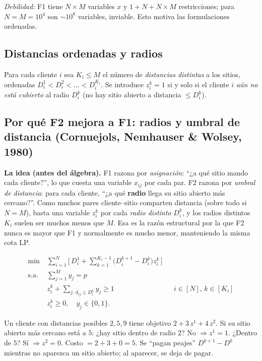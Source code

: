 \emph{Debilidad:} F1 tiene $N\times M$ variables $x$ y $1+N+N\times M$ restricciones; para
$N=M=10^4$ son $\sim 10^8$ variables, inviable. Esto motiva las formulaciones ordenadas.

\subsection{Distancias ordenadas y radios}
Para cada cliente $i$ sea $K_i\le M$ el número de \emph{distancias distintas} a los sitios,
ordenadas $D^1_i<D^2_i<\dots<D^{K_i}_i$. Se introduce $z^k_i=1$ si y solo si el cliente $i$
\emph{aún no está cubierto} al radio $D^k_i$ (no hay sitio abierto a distancia $\le D^k_i$).

\subsection{Por qué F2 mejora a F1: radios y umbral de distancia (Cornuejols, Nemhauser \& Wolsey, 1980)}
\textbf{La idea (antes del álgebra).} F1 razona por \emph{asignación}: ``¿a qué sitio mando cada
cliente?'', lo que cuesta una variable $x_{ij}$ por cada par. F2 razona por \emph{umbral de
distancia}: para cada cliente, ``¿a qué \textbf{radio} llega su sitio abierto más cercano?''.
Como muchos pares cliente--sitio comparten distancia (sobre todo si $N=M$), basta una variable
$z^k_i$ por cada \emph{radio distinto} $D^k_i$, y los radios distintos $K_i$ suelen ser muchos
menos que $M$. Esa es la razón estructural por la que F2 nunca es mayor que F1 y normalmente es
mucho menor, manteniendo la misma cota LP.

\begin{align}
  \min\ & \sum_{i=1}^{N}\Big[\,D^1_i + \sum_{k=1}^{K_i-1}\big(D^{k+1}_i-D^k_i\big)z^k_i\,\Big] \label{eq:f2obj}\\
  \text{s.a.}\ & \sum_{j=1}^{M} y_j=p \nonumber\\
  & z^k_i + \!\!\sum_{j:\,d_{ij}\le D^k_i}\!\! y_j \ge 1 && i\in[N],\,k\in[K_i] \label{eq:f2cov}\\
  & z^k_i\ge 0,\quad y_j\in\{0,1\}. \nonumber
\end{align}

\begin{intuicion}
Un cliente con distancias posibles $2,5,9$ tiene objetivo $2+3\,z^1+4\,z^2$. Si su sitio abierto
más cercano está a $5$: ¿hay sitio dentro de radio $2$? No $\Rightarrow z^1=1$. ¿Dentro de $5$? Sí
$\Rightarrow z^2=0$. Costo $=2+3+0=5$. Se ``pagan peajes'' $D^{k+1}-D^k$ mientras no aparezca un
sitio abierto; al aparecer, se deja de pagar.
\end{intuicion}

